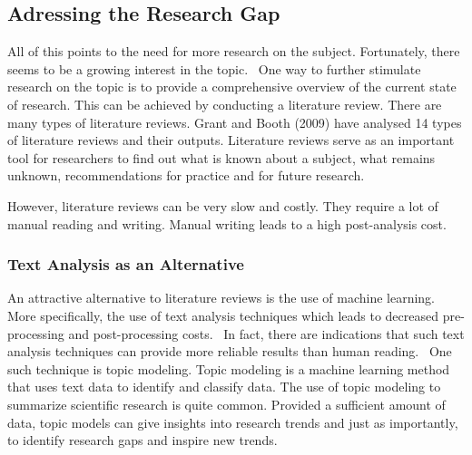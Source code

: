 \subsection*{Adressing the Research Gap}

All of this points to the need for more research on the subject. Fortunately, there seems to be a growing interest in the topic.~\citep{horesearch} One way to further stimulate research on the topic is to provide a comprehensive overview of the current state of research. This can be achieved by conducting a literature review. There are many types of literature reviews. Grant and Booth (2009) have analysed 14 types of literature reviews and their outputs. Literature reviews serve as an important tool for researchers to find out what is known about a subject, what remains unknown, recommendations for practice and for future research.~\citep{grant2009typology}

However, literature reviews can be very slow and costly. They require a lot of manual reading and writing. Manual writing leads to a high post-analysis cost.~\citep{quinn2010analyze}

\subsubsection*{Text Analysis as an Alternative}

An attractive alternative to literature reviews is the use of machine learning. More specifically, the use of text analysis techniques which leads to decreased pre-processing and post-processing costs.~\citep{quinn2010analyze} In fact, there are indications that such text analysis techniques can provide more reliable results than human reading.~\citep{king2003automated}\citep{quinn2010analyze} One such technique is topic modeling. Topic modeling is a machine learning method that uses text data to identify and classify data. The use of topic modeling to summarize scientific research is quite common. Provided a sufficient amount of data, topic models can give insights into research trends and just as importantly, to identify research gaps and inspire new trends.~\citep{luiz2019trait}

